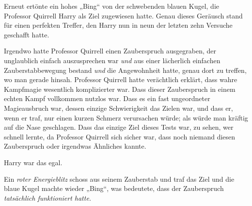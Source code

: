 Erneut ertönte ein hohes
„Bing“ von der schwebenden blauen Kugel, die Professor Quirrell Harry als Ziel zugewiesen hatte. Genau dieses Geräusch stand für einen perfekten Treffer, den Harry nun in neun der letzten zehn Versuche geschafft hatte.

Irgendwo hatte Professor Quirrell einen Zauberspruch ausgegraben, der unglaublich einfach auszusprechen war \emph{und} aus einer lächerlich einfachen Zauberstabbewegung bestand \emph{und} die Angewohnheit hatte, genau dort zu treffen, wo man gerade hinsah. Professor Quirrell hatte verächtlich erklärt, dass wahre Kampfmagie wesentlich komplizierter war. Dass dieser Zauberspruch in einem echten Kampf vollkommen nutzlos war. Dass es ein fast ungeordneter Magieausbruch war, dessen einzige Schwierigkeit das Zielen war, und dass er, wenn er traf, nur einen kurzen Schmerz verursachen würde; als würde man kräftig auf die Nase geschlagen. Dass das einzige Ziel dieses Tests war, zu sehen, wer schnell lernte, da Professor Quirrell sich sicher war, dass noch niemand diesen Zauberspruch oder irgendwas Ähnliches kannte.

Harry war das egal.


Ein \emph{roter Energieblitz} schoss aus seinem Zauberstab und traf das Ziel und die blaue Kugel machte wieder
„Bing“, was bedeutete, dass der Zauberspruch \emph{tatsächlich funktioniert hatte.}


